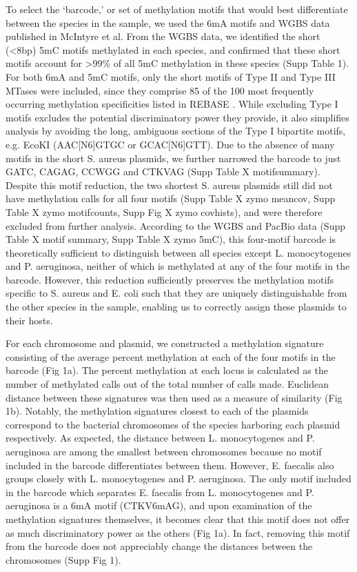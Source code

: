 To select the ‘barcode,’ or set of methylation motifs that would best differentiate between the species in the sample, we used the 6mA motifs and WGBS data published in McIntyre \citep{McIntyre2017-ed} et al. From the WGBS data, we identified the short (<8bp) 5mC motifs methylated in each species, and confirmed that these short motifs account for >99\% of all 5mC methylation in these species (Supp Table 1). For both 6mA and 5mC motifs, only the short motifs of Type II and Type III MTases were included, since they comprise 85 of the 100 most frequently occurring methylation specificities listed in REBASE \citep{Roberts2003-ss}. While excluding Type I motifs excludes the potential discriminatory power they provide, it also simplifies analysis by avoiding the long, ambiguous sections of the Type I bipartite motifs, e.g. EcoKI (AAC[N6]GTGC or GCAC[N6]GTT). Due to the absence of many motifs in the short S. aureus plasmids, we further narrowed the barcode to just GATC, CAGAG, CCWGG and CTKVAG (Supp Table X motifsummary). Despite this motif reduction, the two shortest S. aureus plasmids still did not have methylation calls for all four motifs (Supp Table X zymo meancov, Supp Table X zymo motifcounts, Supp Fig X zymo covhists), and were therefore excluded from further analysis. According to the WGBS and PacBio data \citep{McIntyre2017-ed} (Supp Table X motif summary, Supp Table X zymo 5mC), this four-motif barcode is theoretically sufficient to distinguish between all species except L. monocytogenes and P. aeruginosa, neither of which is methylated at any of the four motifs in the barcode. However, this reduction sufficiently preserves the methylation motifs specific to S. aureus and E. coli such that they are uniquely distinguishable from the other species in the sample, enabling us to correctly assign these plasmids to their hosts.

For each chromosome and plasmid, we constructed a methylation signature consisting of the average percent methylation at each of the four motifs in the barcode (Fig 1a). The percent methylation at each locus is calculated as the number of methylated calls out of the total number of calls made. Euclidean distance between these signatures was then used as a measure of similarity (Fig 1b). Notably, the methylation signatures closest to each of the plasmids correspond to the bacterial chromosomes of the species harboring each plasmid respectively. As expected, the distance between L. monocytogenes and P. aeruginosa are among the smallest between chromosomes because no motif included in the barcode differentiates between them. However, E. faecalis also groups closely with L. monocytogenes and P. aeruginosa. The only motif included in the barcode which separates E. faecalis from L. monocytogenes and P. aeruginosa is a 6mA motif (CTKV6mAG), and upon examination of the methylation signatures themselves, it becomes clear that this motif does not offer as much discriminatory power as the others (Fig 1a). In fact, removing this motif from the barcode does not appreciably change the distances between the chromosomes (Supp Fig 1).

